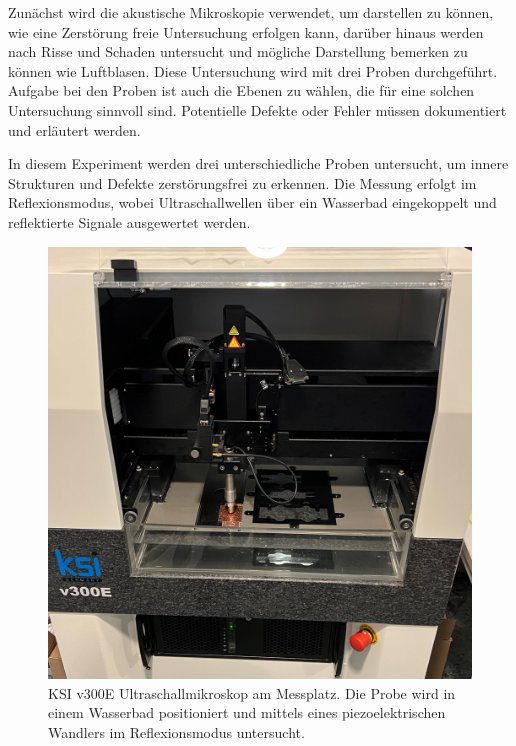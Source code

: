 Zunächst wird die akustische Mikroskopie verwendet, um darstellen zu können, wie eine Zerstörung freie Untersuchung erfolgen kann, darüber hinaus werden nach Risse und Schaden untersucht und mögliche Darstellung bemerken zu können wie Luftblasen. Diese Untersuchung wird mit drei Proben durchgeführt.
Aufgabe bei den Proben ist auch die Ebenen zu wählen, die für eine solchen Untersuchung sinnvoll sind.  Potentielle
Defekte oder Fehler müssen dokumentiert und erläutert werden.


In diesem Experiment werden drei unterschiedliche Proben untersucht, um innere Strukturen und Defekte zerstörungsfrei zu erkennen. Die Messung erfolgt im Reflexionsmodus, wobei Ultraschallwellen über ein Wasserbad eingekoppelt und reflektierte Signale ausgewertet werden.
\begin{figure}[htbp]
    \centering
    \includegraphics[scale=0.11]{Bilder/ksiv8}
    \caption{KSI v300E Ultraschallmikroskop am Messplatz. Die Probe wird in einem Wasserbad positioniert und mittels eines piezoelektrischen Wandlers im Reflexionsmodus untersucht.}
    \vspace{0.2cm}
    \label{Abb.2: KSI v300E Ultraschallmikroskop am Messplatz. Die Probe wird in einem Wasserbad positioniert und mittels eines piezoelektrischen Wandlers im Reflexionsmodus untersucht. }
\end{figure} 
\vspace{0.2cm}

